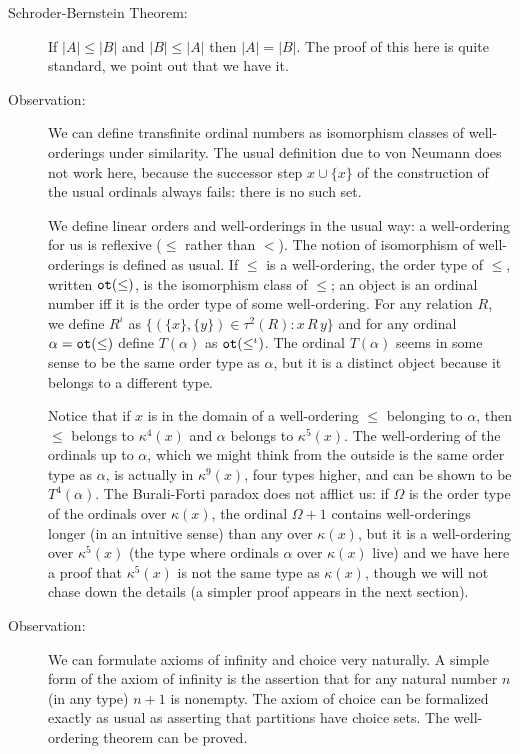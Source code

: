 \documentclass[12pt]{article}
\begin{document}
\begin{description}
\item[Schroder-Bernstein Theorem:]  If $|A| \leq |B|$ and $|B| \leq |A|$ then $|A|=|B|$.  The proof of this here is quite standard, we point out that we have it.

\item[Observation:]  We can define transfinite ordinal numbers as isomorphism classes of well-orderings under similarity.  The usual definition due to von Neumann does not work here, because the successor step $x \cup \{x\}$ of the construction of the usual ordinals always fails:  there is no such set.

 We define linear orders and well-orderings in the usual way:  a well-ordering for us is reflexive ($\leq$ rather than $<$).  The notion of isomorphism of well-orderings is defined as usual.  If $\leq$ is a well-ordering, the order type of $\leq$, written ${\tt ot}(\leq)$, is the isomorphism class of $\leq$;  an object is an ordinal number iff it is the order type of some well-ordering.  For any relation $R$, we define $R^{\iota}$ as $\{(\{x\},\{y\}) \in \tau^2(R):x \, R \, y\}$ and for any ordinal $\alpha ={\tt ot}(\leq)$ define $T(\alpha)$ as ${\tt ot}(\leq^\iota)$.  The ordinal $T(\alpha)$ seems in some sense to be the same order type as $\alpha$, but it is a distinct object because it belongs to a different type.

Notice that if $x$ is in the domain of a well-ordering $\leq$ belonging to $\alpha$, then $\leq$ belongs to $\kappa^4(x)$ and $\alpha$ belongs to $\kappa^5(x)$.  The well-ordering of the ordinals up to $\alpha$, which we might think from the outside is the same order type as $\alpha$, is actually in $\kappa^9(x)$, four types higher, and can be shown to be $T^4(\alpha)$.  The Burali-Forti paradox does not afflict us: if $\Omega$ is the order type of the ordinals over $\kappa(x)$,  the ordinal $\Omega+1$ contains well-orderings longer (in an intuitive sense) than any over $\kappa(x)$, but it is a well-ordering over $\kappa^5(x)$ (the type where ordinals $\alpha$ over $\kappa(x)$ live) and we have here a proof
that $\kappa^5(x)$ is not the same type as $\kappa(x)$, though we will not chase down the details (a simpler proof appears in the next section).

\item[Observation:]  We can formulate axioms of infinity and choice very naturally.  A simple form of the axiom of infinity is the assertion that for any natural number $n$ (in any type) $n+1$ is nonempty.  The axiom of choice can be formalized exactly as usual as asserting that partitions have choice sets.  The well-ordering theorem can be proved.

\end{description}
\end{document}
